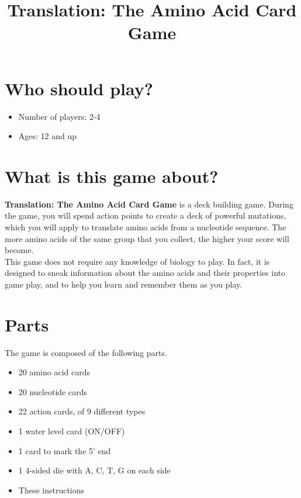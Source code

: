 \documentclass[a4paper,11pt,oneside]{memoir}
\title{Translation: The Amino Acid Card Game}
\author{}
\date{}
\begin{document}
\maketitle


\section*{Who should play?}

\begin{itemize}
    \item Number of players: 2-4
    \item Ages: 12 and up
\end{itemize}


\section*{What is this game about?}

\textbf{Translation: The Amino Acid Card Game} is a deck building game.
During the game, you will spend action points to create a deck of powerful mutations, which you will apply to translate amino acids from a nucleotide sequence.
The more amino acids of the same group that you collect, the higher your score will become. \\

This game does not require any knowledge of biology to play.
In fact, it is designed to sneak information about the amino acids and their properties into game play, and to help you learn and remember them as you play.


\section*{Parts}

The game is composed of the following parts.
\begin{itemize}
    \item 20 amino acid cards
    \item 20 nucleotide cards
    \item 22 action cards, of 9 different types
    \item 1 water level card (ON/OFF)
    \item 1 card to mark the 5' end
    \item 1 4-sided die with A, C, T, G on each side %
    \item These instructions
\end{itemize}
\end{document}
